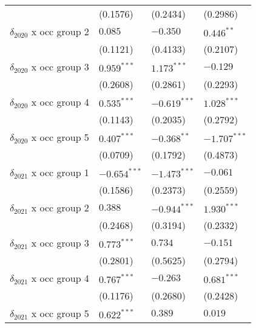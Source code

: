 \begin{tabular}{llll}
                                       &           (0.1576) &           (0.2434) &           (0.2986) \\
$\delta_{2020}$ x occ group 2          &            $0.085$ &           $-0.350$ &       $0.446^{**}$ \\
                                       &           (0.1121) &           (0.4133) &           (0.2107) \\
$\delta_{2020}$ x occ group 3          &      $0.959^{***}$ &      $1.173^{***}$ &           $-0.129$ \\
                                       &           (0.2608) &           (0.2861) &           (0.2293) \\
$\delta_{2020}$ x occ group 4          &      $0.535^{***}$ &     $-0.619^{***}$ &      $1.028^{***}$ \\
                                       &           (0.1143) &           (0.2035) &           (0.2792) \\
$\delta_{2020}$ x occ group 5          &      $0.407^{***}$ &      $-0.368^{**}$ &     $-1.707^{***}$ \\
                                       &           (0.0709) &           (0.1792) &           (0.4873) \\
$\delta_{2021}$ x occ group 1          &     $-0.654^{***}$ &     $-1.473^{***}$ &           $-0.061$ \\
                                       &           (0.1586) &           (0.2373) &           (0.2559) \\
$\delta_{2021}$ x occ group 2          &            $0.388$ &     $-0.944^{***}$ &      $1.930^{***}$ \\
                                       &           (0.2468) &           (0.3194) &           (0.2332) \\
$\delta_{2021}$ x occ group 3          &      $0.773^{***}$ &            $0.734$ &           $-0.151$ \\
                                       &           (0.2801) &           (0.5625) &           (0.2794) \\
$\delta_{2021}$ x occ group 4          &      $0.767^{***}$ &           $-0.263$ &      $0.681^{***}$ \\
                                       &           (0.1176) &           (0.2680) &           (0.2428) \\
$\delta_{2021}$ x occ group 5          &      $0.622^{***}$ &            $0.389$ &            $0.019$ \\

\end{tabular}
